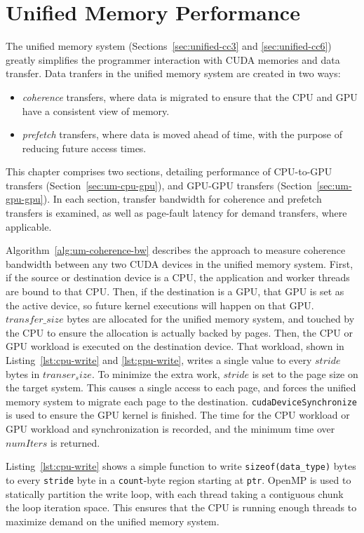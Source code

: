 \chapter{Unified Memory Performance}
\label{ch:unified}

The unified memory system (Sections~\ref{sec:unified-cc3} and \ref{sec:unified-cc6}) greatly simplifies the programmer interaction with CUDA memories and data transfer.
Data tranfers in the unified memory system are created in two ways:
\begin{itemize}
    \item \textit{coherence} transfers, where data is migrated to ensure that the CPU and GPU have a consistent view of memory.
    \item \textit{prefetch} transfers, where data is moved ahead of time, with the purpose of reducing future access times. 
\end{itemize}
This chapter comprises two sections, detailing performance of CPU-to-GPU transfers (Section~\ref{sec:um-cpu-gpu}), and GPU-GPU transfers (Section~\ref{sec:um-gpu-gpu}).
In each section, transfer bandwidth for coherence and prefetch transfers is examined, as well as page-fault latency for demand transfers, where applicable.

Algorithm~\ref{alg:um-coherence-bw} describes the approach to measure coherence bandwidth between any two CUDA devices in the unified memory system.
First, if the source or destination device is a CPU, the application and worker threads are bound to that CPU.
Then, if the destination is a GPU, that GPU is set as the active device, so future kernel executions will happen on that GPU.
$transfer\_size$ bytes are allocated for the unified memory system, and touched by the CPU to ensure the allocation is actually backed by pages.
Then, the CPU or GPU workload is executed on the destination device.
That workload, shown in Listing~\ref{lst:cpu-write} and \ref{lst:gpu-write}, writes a single value to every $stride$ bytes in $transer_size$.
To minimize the extra work, $stride$ is set to the page size on the target system.
This causes a single access to each page, and forces the unified memory system to migrate each page to the destination.
\texttt{cudaDeviceSynchronize} is used to ensure the GPU kernel is finished.
The time for the CPU workload or GPU workload and synchronization is recorded, and the minimum time over $numIters$ is returned.

Listing~\ref{lst:cpu-write} shows a simple function to write \texttt{sizeof(data\_type)} bytes to every \texttt{stride} byte in a \texttt{count}-byte region starting at \texttt{ptr}.
OpenMP is used to statically partition the write loop, with each thread taking a contiguous chunk the loop iteration space.
This ensures that the CPU is running enough threads to maximize demand on the unified memory system.

